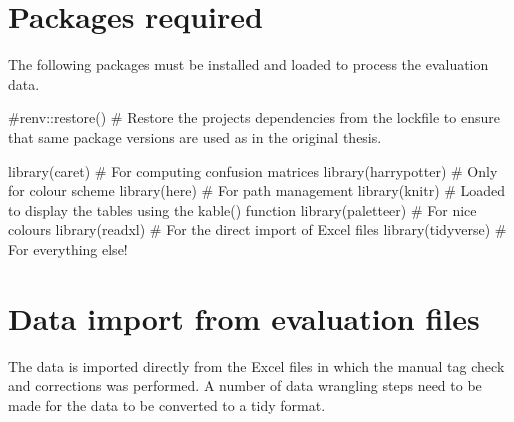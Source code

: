 \documentclass[
  letterpaper,
  DIV=11,
  numbers=noendperiod]{scrreprt}
\newenvironment{Shaded}{\begin{snugshade}}{\end{snugshade}}
\newcommand{\CommentTok}[1]{\textcolor[rgb]{0.37,0.37,0.37}{#1}}
\newcommand{\FunctionTok}[1]{\textcolor[rgb]{0.28,0.35,0.67}{#1}}
\newcommand{\NormalTok}[1]{\textcolor[rgb]{0.00,0.23,0.31}{#1}}
\begin{document}
\section{Packages required}\label{packages-required}

The following packages must be installed and loaded to process the
evaluation data.

\begin{Shaded}
\begin{Highlighting}[]
\CommentTok{\#renv::restore() \# Restore the project\textquotesingle{}s dependencies from the lockfile to ensure that same package versions are used as in the original thesis.}

\FunctionTok{library}\NormalTok{(caret) }\CommentTok{\# For computing confusion matrices}
\FunctionTok{library}\NormalTok{(harrypotter) }\CommentTok{\# Only for colour scheme}
\FunctionTok{library}\NormalTok{(here) }\CommentTok{\# For path management}
\FunctionTok{library}\NormalTok{(knitr) }\CommentTok{\# Loaded to display the tables using the kable() function}
\FunctionTok{library}\NormalTok{(paletteer) }\CommentTok{\# For nice colours}
\FunctionTok{library}\NormalTok{(readxl) }\CommentTok{\# For the direct import of Excel files}
\FunctionTok{library}\NormalTok{(tidyverse) }\CommentTok{\# For everything else!}
\end{Highlighting}
\end{Shaded}

\section{Data import from evaluation
files}\label{data-import-from-evaluation-files}

The data is imported directly from the Excel files in which the manual
tag check and corrections was performed. A number of data wrangling
steps need to be made for the data to be converted to a tidy format.
\end{document}
